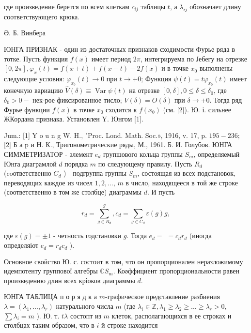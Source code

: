\documentclass[10pt]{article}
\begin{document}
где произведение берется по всем клеткам $c_{i j}$ таблицы $t$, а $\lambda_{i j}$ обозначает длину соответствующего крюка.



Ә. Б. Винбера



ЮНГА ПРИЗНАК - один из достаточных признаков сходимости Фурье ряда в тотке. Пусть функция $f(x)$ имеет период $2 \pi$, интегрируема по Јебегу на отрезке $[0,2 \pi], \varphi_{x}(t)=f(x+t)+f(x-t)-2 f(x)$ и в точке $x_{0}$ выполнены следующие условия: $\varphi_{x_{0}}(t) \longrightarrow 0$ при $t \longrightarrow+0$; Функция $\psi(t)=t \varphi_{x_{0}}(t)$ имеет конечную вариацию $\hat{V}(\delta) \equiv \operatorname{Var} \psi(t)$ на отрезке $[0, \delta], 0 \leqslant \delta \leqslant \delta_{0}$, где $\delta_{0}>0-$ нек-рое фиксированное тисло; $V(\delta)=O(\delta)$ при $\delta \longrightarrow+0$. Тогда ряд Фурье функции $f(x)$ в точке $x_{0}$ сходится к $f\left(x_{0}\right)$ (см. [2]). Ю. і. сильнее ЖКордана признака. Установлен $\mathrm{Y}$. Юнгом [1].



Jum.: [1] Y o u n g W. H., "Proc. Lond. Math. Soc.», 1916, v. 17, p. $195-236 ;$ [2] Б а p и Н. К., Тригонометрические ряды, М., 1961. Б. И. Голубов. ЮНГА СИММЕТРИЗАТОР - элемент $e_{d}$ групшового кольца группы $S_{m}$, определяемый Юнга диаграмлой $d$ порядка $m$ по следующему правилу. Пусть $R_{d}$ (coответственно $C_{d}$ ) - подгруппа группы $S_{m}$, состоящая из всех подстановок, переводящих каждое из чисел $1,2, \ldots$, $m$ в число, находящееся в той же строке (соответственно в том же столбце) диаграммы $d$. И пусть



\[

r_{d}=\sum_{g \in R_{d}}^{g}, c_{d}=\sum_{g \in C_{d}} \varepsilon(g) g,

\]



где $\varepsilon(g)= \pm 1$ - четность годстановки $g$. Тогда $e_{d}=$ $=c_{d} r_{d}$ (иногда определяіот $e_{d}=r_{d} c_{d}$ ).



Основное своӥство Ю. с. состоит в том, что он пропорционален неразложимому идемпотенту группової алгебры $\mathbb{C} S_{m}$. Коәффициент пропорциональности равен произведению длин всех кріоков диаграммы $d$.



ЮНГА ТАБЛИЦА п о р я д к а $m$-графическое представление разбиения $\lambda=\left(\lambda_{1}, \ldots, \lambda_{r}\right)$ натурального числа $m$ (где $\lambda_{i} \in \mathbb{Z}, \lambda_{1} \geqslant \lambda_{2} \geqslant \ldots \geqslant \lambda_{r}>0$, $\sum \lambda_{i}=m$ ). Ю. т. $t \lambda$ состопт из $m$ клеток, располагающихся в ее строках и столбцах таким образом, что в $i$-й строке находится
\end{document}
